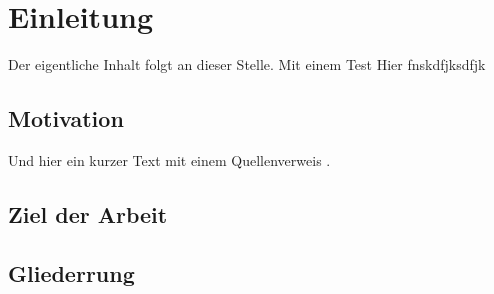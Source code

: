 \chapter{Einleitung}
Der eigentliche Inhalt folgt an dieser Stelle. Mit einem Test
Hier fnskdfjksdfjk
\section{Motivation}
Und hier ein kurzer Text mit einem Quellenverweis \autocite{Schlosser14}.
\section{Ziel der Arbeit}
\section{Gliederrung}